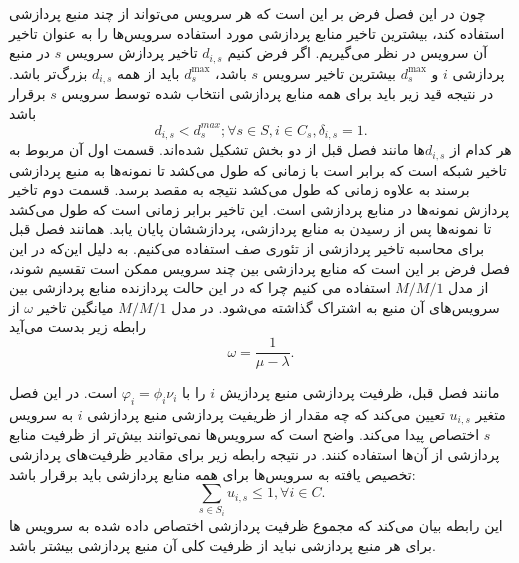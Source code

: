     چون در این فصل فرض بر این است که هر سرویس می‌تواند از چند منبع پردازشی استفاده کند، بیشترین تاخیر منابع پردازشی مورد استفاده سرویس‌ها را به عنوان تاخیر آن سرویس در نظر می‌گیریم.
    اگر فرض کنیم $d_{i,s}$ تاخیر پردازش سرویس $s$ در منبع پردازشی $i$ و $d_s^\text{max}$ بیشترین تاخیر سرویس $s$ باشد، $d_s^\text{max}$ باید از همه $d_{i,s}$ بزرگ‌تر باشد.
    در نتیجه قید زیر باید برای همه منابع پردازشی انتخاب شده توسط سرویس $s$ برقرار باشد
    \begin{equation}\label{eqn:max_delay}
      d_{i,s} < d_s^{max}; \forall s \in S, i \in C_s, \delta_{i,s} = 1.
    \end{equation}
    هر کدام از $d_{i,s}$ها مانند فصل قبل از دو بخش تشکیل شده‌اند.
    قسمت اول آن مربوط به تاخیر شبکه است که برابر است با زمانی که طول می‌کشد تا نمونه‌ها به منبع پردازشی برسند به علاوه زمانی که طول می‌کشد نتیجه به مقصد برسد.
    قسمت دوم تاخیر پردازش نمونه‌ها در منابع پردازشی است.
    این تاخیر برابر زمانی است که طول می‌کشد تا نمونه‌ها پس از رسیدن به منابع پردازشی، پردازششان پایان یابد.
    همانند فصل قبل برای محاسبه تاخیر پردازشی از تئوری صف استفاده می‌کنیم.
    به دلیل این‌که در این فصل فرض بر این است که منابع پردازشی بین چند سرویس ممکن است تقسیم شوند، از مدل $M/M/1$ استفاده می کنیم چرا که در این حالت پردازنده منابع پردازشی بین سرویس‌های آن منبع به اشتراک گذاشته می‌شود.
    در مدل $M/M/1$ میانگین تاخیر $\omega$ از رابطه زیر بدست می‌آید\cite{basic_queueing_sztrik}
    \begin{equation}
      \omega = \frac{1}{\mu-\lambda}.
    \end{equation}

    مانند فصل قبل، ظرفیت پردازشی منبع پردازیش $i$ را با $\varphi_i = \phi_i \nu_i$ است.
    در این فصل متغیر $u_{i,s}$ تعیین می‌کند که چه مقدار از ظریفیت پردازشی منبع پردازشی $i$ به سرویس $s$ اختصاص پیدا می‌کند.
    واضح است که سرویس‌ها نمی‌توانند بیش‌تر از ظرفیت منابع پردازشی از آن‌ها استفاده کنند.
    در نتیجه رابطه زیر برای مقادیر ظرفیت‌های پردازشی تخصیص یافته به سرویس‌ها برای همه منابع پردازشی باید برقرار باشد:
    \begin{equation}
      \sum_{s \in S_i} u_{i,s} \le 1, \forall i \in C.
    \end{equation}
    این رابطه بیان می‌کند که مجموع ظرفیت پردازشی اختصاص داده شده به سرویس ها برای هر منبع پردازشی نباید از ظرفیت کلی آن منبع پردازشی بیشتر باشد.

